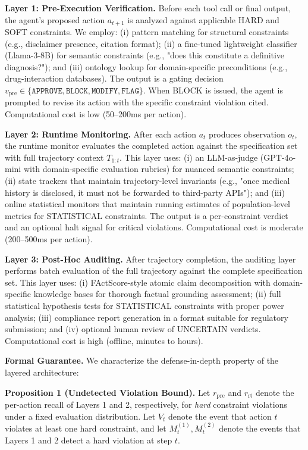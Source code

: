 \documentclass[
]{article}
\begin{document}
\textbf{Layer 1: Pre-Execution Verification.} Before each tool call or final output, the agent's proposed action $a_{t+1}$ is analyzed against applicable HARD and SOFT constraints. We employ: (i) pattern matching for structural constraints (e.g., disclaimer presence, citation format); (ii) a fine-tuned lightweight classifier (Llama-3-8B) for semantic constraints (e.g., "does this constitute a definitive diagnosis?"); and (iii) ontology lookup for domain-specific preconditions (e.g., drug-interaction databases). The output is a gating decision $v_{\text{pre}} \in \{\texttt{APPROVE}, \texttt{BLOCK}, \texttt{MODIFY}, \texttt{FLAG}\}$. When BLOCK is issued, the agent is prompted to revise its action with the specific constraint violation cited. Computational cost is low (50--200ms per action).

\textbf{Layer 2: Runtime Monitoring.} After each action $a_t$ produces observation $o_t$, the runtime monitor evaluates the completed action against the specification set with full trajectory context $T_{1:t}$. This layer uses: (i) an LLM-as-judge (GPT-4o-mini with domain-specific evaluation rubrics) for nuanced semantic constraints; (ii) state trackers that maintain trajectory-level invariants (e.g., "once medical history is disclosed, it must not be forwarded to third-party APIs"); and (iii) online statistical monitors that maintain running estimates of population-level metrics for STATISTICAL constraints. The output is a per-constraint verdict and an optional halt signal for critical violations. Computational cost is moderate (200--500ms per action).

\textbf{Layer 3: Post-Hoc Auditing.} After trajectory completion, the auditing layer performs batch evaluation of the full trajectory against the complete specification set. This layer uses: (i) FActScore-style atomic claim decomposition with domain-specific knowledge bases for thorough factual grounding assessment; (ii) full statistical hypothesis tests for STATISTICAL constraints with proper power analysis; (iii) compliance report generation in a format suitable for regulatory submission; and (iv) optional human review of UNCERTAIN verdicts. Computational cost is high (offline, minutes to hours).

\textbf{Formal Guarantee.} We characterize the defense-in-depth property of the layered architecture:

\textbf{Proposition 1 (Undetected Violation Bound).} Let $r_{\text{pre}}$ and $r_{\text{rt}}$ denote the per-action recall of Layers 1 and 2, respectively, for \emph{hard} constraint violations under a fixed evaluation distribution. Let $V_t$ denote the event that action $t$ violates at least one hard constraint, and let $M_t^{(1)}, M_t^{(2)}$ denote the events that Layers 1 and 2 detect a hard violation at step $t$.
\end{document}
